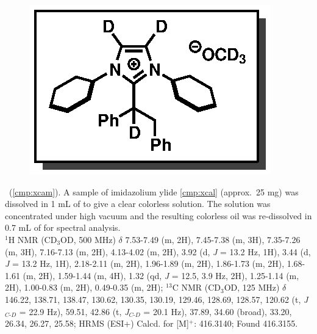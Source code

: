 \vspace{10pt}
\begin{figure}
  \vspace{-25pt}
  \begin{center}
    \includegraphics[scale=0.8]{chp_alkylation/images/xcam}
  \end{center}
  \vspace{-30pt}
\end{figure}
\noindent \textbf{\CMPxcam}\ (\ref{cmp:xcam}). A sample of imidazolium ylide \ref{cmp:xcal}
(approx.~25 mg) was dissolved in 1 mL of  to give a clear colorless solution. The solution was concentrated
under high vacuum and the resulting colorless oil was re-dissolved in 0.7 mL of  for
spectral analysis.
\\ 
$^1$H NMR (CD$_3$OD, 500 MHz) $\delta$ 7.53-7.49 (m, 2H), 7.45-7.38 (m, 3H), 7.35-7.26 (m, 3H),
7.16-7.13 (m, 2H), 4.13-4.02 (m, 2H), 3.92 (d, \textit{J} = 13.2 Hz, 1H), 3.44 (d, \textit{J} =
13.2 Hz, 1H), 2.18-2.11 (m, 2H), 1.96-1.89 (m, 2H), 1.86-1.73 (m, 2H), 1.68-1.61 (m, 2H), 1.59-1.44
(m, 4H), 1.32 (qd, \textit{J} = 12.5, 3.9 Hz, 2H), 1.25-1.14 (m, 2H), 1.00-0.83 (m,
2H), 0.49-0.35 (m, 2H); $^{13}$C NMR (CD$_3$OD, 125 MHz) $\delta$ 146.22, 138.71, 138.47, 130.62,
130.35, 130.19, 129.46, 128.69, 128.57, 120.62 (t, \textit{J}$_{C\mbox{-}D}$ = 22.9 Hz), 59.51,
42.86 (t, \textit{J}$_{C\mbox{-}D}$ = 20.1 Hz), 37.89, 34.60 (broad), 33.20, 26.34, 26.27, 25.58;
HRMS (ESI+) Calcd.
for  [M]$^+$:
416.3140;  Found 416.3155.

